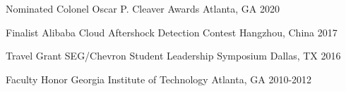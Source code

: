 \begin{cvhonors}

  \cvhonor
    {Nominated} %
    {Colonel Oscar P. Cleaver Awards} %
    {Atlanta, GA} %
    {2020} %
    
  \cvhonor
    {Finalist} %
    {Alibaba Cloud Aftershock Detection Contest} %
    {Hangzhou, China} %
    {2017} %

  \cvhonor
    {Travel Grant} %
    {SEG/Chevron Student Leadership Symposium} %
    {Dallas, TX} %
    {2016} %

  \cvhonor
    {Faculty Honor} %
    {Georgia Institute of Technology} %
    {Atlanta, GA} %
    {2010-2012} %




\end{cvhonors}
